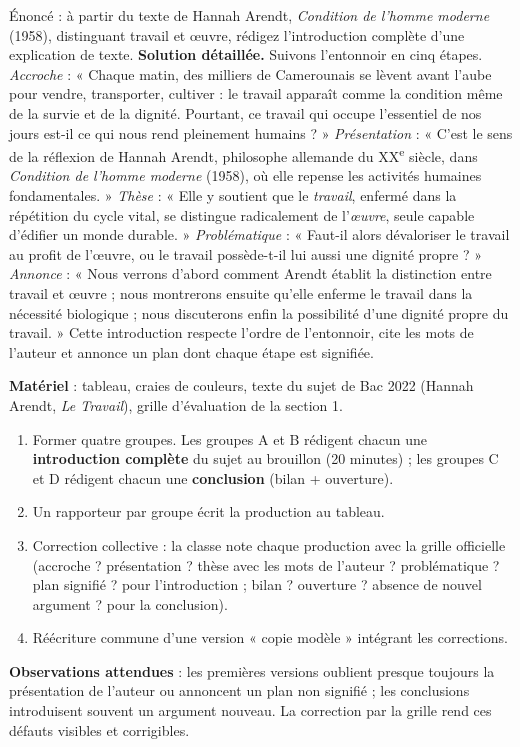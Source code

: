 \documentclass[11pt]{article}
\begin{document}
\begin{exoresolu}
Énoncé : à partir du texte de Hannah Arendt, \emph{Condition de l'homme moderne} (1958), distinguant travail et \oe uvre, rédigez l'introduction complète d'une explication de texte.
\tcblower
\textbf{Solution détaillée.} Suivons l'entonnoir en cinq étapes.
\emph{Accroche} : « Chaque matin, des milliers de Camerounais se lèvent avant l'aube pour vendre, transporter, cultiver : le travail apparaît comme la condition même de la survie et de la dignité. Pourtant, ce travail qui occupe l'essentiel de nos jours est-il ce qui nous rend pleinement humains ? »
\emph{Présentation} : « C'est le sens de la réflexion de Hannah Arendt, philosophe allemande du XX\textsuperscript{e} siècle, dans \emph{Condition de l'homme moderne} (1958), où elle repense les activités humaines fondamentales. »
\emph{Thèse} : « Elle y soutient que le \emph{travail}, enfermé dans la répétition du cycle vital, se distingue radicalement de l'\emph{\oe uvre}, seule capable d'édifier un monde durable. »
\emph{Problématique} : « Faut-il alors dévaloriser le travail au profit de l'\oe uvre, ou le travail possède-t-il lui aussi une dignité propre ? »
\emph{Annonce} : « Nous verrons d'abord comment Arendt établit la distinction entre travail et \oe uvre ; nous montrerons ensuite qu'elle enferme le travail dans la nécessité biologique ; nous discuterons enfin la possibilité d'une dignité propre du travail. »
Cette introduction respecte l'ordre de l'entonnoir, cite les mots de l'auteur et annonce un plan dont chaque étape est signifiée.
\end{exoresolu}

\begin{experience}
\textbf{Matériel} : tableau, craies de couleurs, texte du sujet de Bac 2022 (Hannah Arendt, \emph{Le Travail}), grille d'évaluation de la section 1.
\begin{enumerate}
\item Former quatre groupes. Les groupes A et B rédigent chacun une \textbf{introduction complète} du sujet au brouillon (20 minutes) ; les groupes C et D rédigent chacun une \textbf{conclusion} (bilan + ouverture).
\item Un rapporteur par groupe écrit la production au tableau.
\item Correction collective : la classe note chaque production avec la grille officielle (accroche ? présentation ? thèse avec les mots de l'auteur ? problématique ? plan signifié ? pour l'introduction ; bilan ? ouverture ? absence de nouvel argument ? pour la conclusion).
\item Réécriture commune d'une version « copie modèle » intégrant les corrections.
\end{enumerate}
\textbf{Observations attendues} : les premières versions oublient presque toujours la présentation de l'auteur ou annoncent un plan non signifié ; les conclusions introduisent souvent un argument nouveau. La correction par la grille rend ces défauts visibles et corrigibles.
\end{experience}
\end{document}
